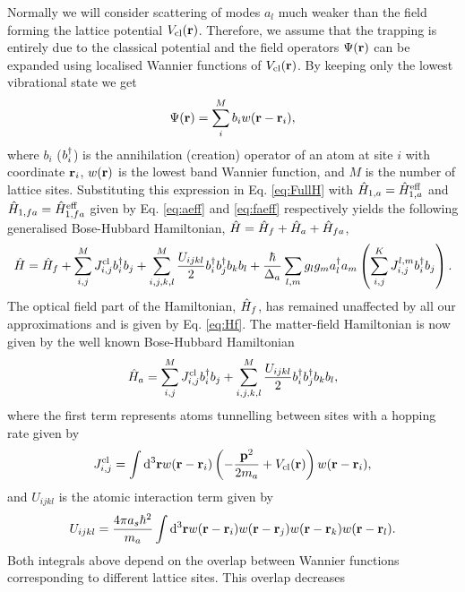 Normally we will consider scattering of modes $a_l$ much weaker than
the field forming the lattice potential
$V_\mathrm{cl}(\mathbf{r})$. Therefore, we assume that the trapping is
entirely due to the classical potential and the field operators
$\Psi(\mathbf{r})$ can be expanded using localised Wannier functions of
$V_\mathrm{cl}(\mathbf{r})$. By keeping only the lowest vibrational state
we get
\begin{equation}
  \Psi(\mathbf{r}) = \sum_i^M b_i w(\mathbf{r} - \mathbf{r}_i),
\end{equation} 
where $b_i$ ($b^\dagger_i$) is the annihilation (creation) operator of an
atom at site $i$ with coordinate $\mathbf{r}_i$, $w(\mathbf{r})$ is the lowest
band Wannier function, and $M$ is the number of lattice
sites. Substituting this expression in Eq. \eqref{eq:FullH} with
$\hat{H}_{1,a} = \hat{H}_{1,a}^\mathrm{eff}$ and
$\hat{H}_{1,fa} = \hat{H}_{1,fa}^\mathrm{eff}$ given by Eq. \eqref{eq:aeff} and
\eqref{eq:faeff} respectively yields the following generalised
Bose-Hubbard Hamiltonian, $\hat{H} = \hat{H}_f + \hat{H}_a + \hat{H}_{fa}$,
\begin{equation}
  \hat{H} = \hat{H}_f + \sum_{i,j}^M J^\mathrm{cl}_{i,j} b^\dagger_i b_j + 
  \sum_{i,j,k,l}^M \frac{U_{ijkl}}{2} b^\dagger_i b^\dagger_j b_k b_l + 
  \frac{\hbar}{\Delta_a} \sum_{l,m} g_l g_m a^\dagger_l a_m 
  \left( \sum_{i,j}^K J^{l,m}_{i,j} b^\dagger_i b_j \right).
\end{equation}
The optical field part of the Hamiltonian, $\hat{H}_f$, has remained
unaffected by all our approximations and is given by
Eq. \eqref{eq:Hf}. The matter-field Hamiltonian is now given by the
well known Bose-Hubbard Hamiltonian
\begin{equation}
  \hat{H}_a = \sum_{i,j}^M J^\mathrm{cl}_{i,j} b^\dagger_i b_j + 
  \sum_{i,j,k,l}^M \frac{U_{ijkl}}{2} b^\dagger_i b^\dagger_j b_k b_l,
\end{equation}
where the first term represents atoms tunnelling between sites with a
hopping rate given by
\begin{equation}
  J^\mathrm{cl}_{i,j} = \int \mathrm{d}^3 \mathbf{r} w (\mathbf{r} - \mathbf{r}_i ) 
  \left( -\frac{\mathbf{p}^2}{2 m_a} + V_\mathrm{cl}(\mathbf{r}) \right) w(\mathbf{r}
  - \mathbf{r}_i),
\end{equation}
and $U_{ijkl}$ is the atomic interaction term given by
\begin{equation}
  U_{ijkl} = \frac{4 \pi a_s \hbar^2}{m_a} \int \mathrm{d}^3 \mathbf{r} 
  w(\mathbf{r} - \mathbf{r}_i) w(\mathbf{r} - \mathbf{r}_j) w(\mathbf{r} - \mathbf{r}_k) w(\mathbf{r} - \mathbf{r}_l).
\end{equation}
Both integrals above depend on the overlap between Wannier functions
corresponding to different lattice sites. This overlap decreases
